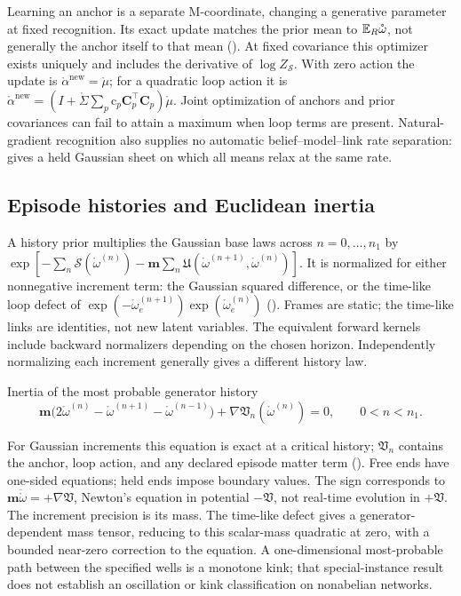 Learning an anchor is a separate M-coordinate, changing a generative parameter at fixed
recognition. Its exact update matches the prior mean to $\mathbb E_R\mathring\omega$, not generally
the anchor itself to that mean (). At fixed covariance
this optimizer exists uniquely and includes the derivative of $\log Z_{\mathscr S}$.
With zero action the update is $\mathring\alpha^{\mathrm{new}}=\mathring\mu$; for a quadratic
loop action it is
$\mathring\alpha^{\mathrm{new}}=(I+\mathring\Sigma\sum_p\mathrm c_p\mathbf C_p^\top\mathbf C_p)
\mathring\mu$. Joint optimization of anchors and prior covariances can fail to attain a
maximum when loop terms are present. Natural-gradient recognition also supplies no automatic
belief--model--link rate separation:  gives a held Gaussian sheet on which
all means relax at the same rate.

\subsection{Episode histories and Euclidean inertia}

A history prior multiplies the Gaussian base laws across $n=0,\ldots,n_1$ by
$\exp[-\sum_n\mathscr S(\mathring\omega^{(n)})
-\mathbf m\sum_n\mathfrak U(\mathring\omega^{(n+1)},\mathring\omega^{(n)})]$.
It is normalized for either nonnegative increment term: the Gaussian squared difference,
or the time-like loop defect of
$\exp(-\mathring\omega^{(n+1)}_e)\exp(\mathring\omega^{(n)}_e)$
(). Frames are static; the time-like links are identities,
not new latent variables. The equivalent forward kernels include backward normalizers
depending on the chosen horizon. Independently normalizing each increment generally gives
a different history law.

\begin{keyequation}{Inertia of the most probable generator history}
\[
\mathbf m\bigl(2\mathring\omega^{(n)}-\mathring\omega^{(n+1)}
-\mathring\omega^{(n-1)}\bigr)
+\nabla\mathfrak V_n(\mathring\omega^{(n)})=0,
\qquad 0<n<n_1.
\]
\end{keyequation}

For Gaussian increments this equation is exact at a critical history; $\mathfrak V_n$
contains the anchor, loop action, and any declared episode matter term
(). Free ends have one-sided equations; held ends impose boundary
values. The sign corresponds to $\mathbf m\ddot{\mathring\omega}=+\nabla\mathfrak V$,
Newton's equation in potential $-\mathfrak V$, not real-time evolution in $+\mathfrak V$.
The increment precision is its mass. The time-like defect gives a generator-dependent
mass tensor, reducing to this scalar-mass quadratic at zero, with a bounded near-zero
correction to the equation. A one-dimensional most-probable path between the specified
wells is a monotone kink; that special-instance result does not establish an oscillation
or kink classification on nonabelian networks.

